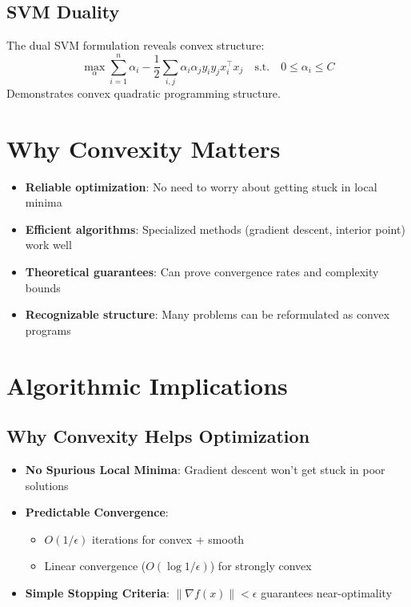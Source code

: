 \documentclass{article}
\theoremstyle{plain}
\begin{document}
\subsection{SVM Duality} %
The dual SVM formulation reveals convex structure:
\[
\max_\alpha \sum_{i=1}^n \alpha_i - \frac{1}{2}\sum_{i,j} \alpha_i\alpha_j y_iy_j x_i^\top x_j \quad \text{s.t.} \quad 0 \leq \alpha_i \leq C
\]
Demonstrates convex quadratic programming structure.

\section{Why Convexity Matters}
\begin{itemize}
    \item \textbf{Reliable optimization}: No need to worry about getting stuck in local minima
    
    \item \textbf{Efficient algorithms}: Specialized methods (gradient descent, interior point) work well
    
    \item \textbf{Theoretical guarantees}: Can prove convergence rates and complexity bounds
    
    \item \textbf{Recognizable structure}: Many problems can be reformulated as convex programs
\end{itemize}

\section{Algorithmic Implications} %
\subsection{Why Convexity Helps Optimization}
\begin{itemize}
    \item \textbf{No Spurious Local Minima}: Gradient descent won't get stuck in poor solutions
    
    \item \textbf{Predictable Convergence}:
    \begin{itemize}
        \item \( O(1/\epsilon) \) iterations for convex + smooth
        \item Linear convergence (\( O(\log 1/\epsilon) \)) for strongly convex
    \end{itemize}
    
    \item \textbf{Simple Stopping Criteria}: \( \|\nabla f(x)\| < \epsilon \) guarantees near-optimality
\end{itemize}
\end{document}
